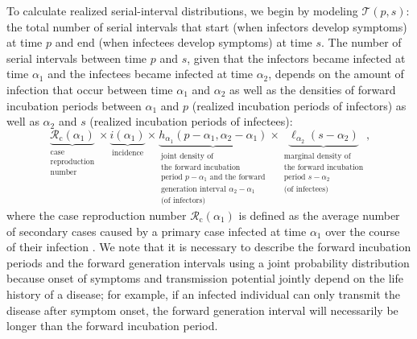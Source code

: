 \documentclass[12pt]{article}
\newcommand{\Rx}[1]{\ensuremath{{\mathcal R}_{#1}}\xspace}
\newcommand{\Rc}{\Rx{\mathrm{c}}}
\newcommand{\psymp}{\ensuremath{p}} %
\newcommand{\ssymp}{\ensuremath{s}} %
\newcommand{\pinf}{\ensuremath{\alpha_1}} %
\newcommand{\sinf}{\ensuremath{\alpha_2}} %
\newcommand{\idist}{\ell} %
\newcommand{\total}{{\mathcal T}} %
\begin{document}
To calculate realized serial-interval distributions, we begin by modeling $\total(\psymp,\ssymp)$: the total number of serial intervals that start (when infectors develop symptoms) at time $\psymp$ and end (when infectees develop symptoms) at time $\ssymp$.
The number of serial intervals between time $\psymp$ and $\ssymp$, given that the infectors became infected at time $\pinf$ and the infectees became infected at time $\sinf$, depends on the amount of infection that occur between time $\pinf$ and $\sinf$ as well as the densities of forward incubation periods between $\pinf$ and $\psymp$ (realized incubation periods of infectors) as well as $\sinf$ and $\ssymp$ (realized incubation periods of infectees):
\begin{equation}
\underbrace{\Rc (\pinf)}_{\substack{\text{case} \\ \text{reproduction} \\ \text{number}}} 
\times 
\underbrace{i(\pinf)}_{\text{incidence}} 
\times 
\underbrace{h_{\pinf}(\psymp-\pinf, \sinf - \pinf)}_{\substack{\text{joint density of} \\ \text{the forward incubation} \\ \text{period } p-\pinf \text{ and the forward} \\ \text{generation interval } \sinf-\pinf\\ \text{(of infectors)}}}
\times
\underbrace{\idist_{\sinf}(\ssymp - \sinf)}_{\substack{\text{marginal density of} \\ \text{the forward incubation} \\ \text{period } \ssymp-\sinf \\ \text{(of infectees)}}},
\end{equation}
where the case reproduction number $\Rc (\pinf)$ is defined as the average number of secondary cases caused by a primary case infected at time $\pinf$ over the course of their infection \citep{fraser2007estimating}.
We note that it is necessary to describe the forward incubation periods and the forward generation intervals using a joint probability distribution because onset of symptoms and transmission potential jointly depend on the life history of a disease;
for example, if an infected individual can only transmit the disease after symptom onset, the forward generation interval will necessarily be longer than the forward incubation period.
\end{document}
